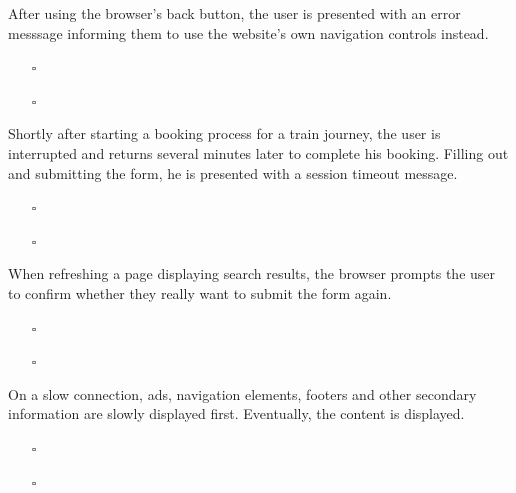 \documentclass{beamer}
\begin{document}
\begin{frame}
  After using the browser's back button, the user is presented with an error
  messsage informing them to use the website's own navigation controls instead.

  \vspace{0.3cm}
  \begin{itemize}
    \item[$\square$] 
    \item[$\square$] 
  \end{itemize}

\end{frame}

\begin{frame}
  Shortly after starting a booking process for a train journey, the user is
  interrupted and returns several minutes later to complete his booking. Filling
  out and submitting the form, he is presented with a session timeout message.

  \vspace{0.3cm}
  \begin{itemize}
    \item[$\square$] 
    \item[$\square$] 
  \end{itemize}

\end{frame}

\begin{frame}
  When refreshing a page displaying search results, the browser prompts the
  user to confirm whether they really want to submit the form again.

  \vspace{0.3cm}
  \begin{itemize}
    \item[$\square$] 
    \item[$\square$] 
  \end{itemize}

\end{frame}

\begin{frame}
  On a slow connection, ads, navigation elements, footers and other secondary
  information are slowly displayed first. Eventually, the content is displayed.

  \vspace{0.3cm}
  \begin{itemize}
    \item[$\square$] 
    \item[$\square$] 
  \end{itemize}

\end{frame}
\end{document}

